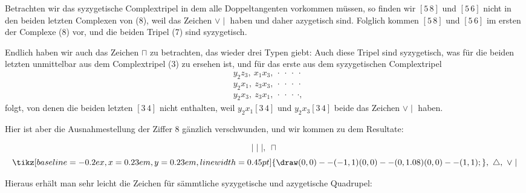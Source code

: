 \providecommand{\weberthreeup}{\mathord{\tikz[baseline=-0.2ex,x=0.23em,y=0.23em,line width=0.45pt]{\draw (0,0)--(-1,1) (0,0)--(0,1.08) (0,0)--(1,1);}}}
Betrachten wir das syzygetische Complextripel
in dem alle Doppeltangenten vorkommen müssen, so finden wir
$[5\,8]$ und $[5\,6]$ nicht in den beiden letzten Complexen von (8),
weil
das Zeichen $\vee\mid$ haben und daher azygetisch sind. Folglich kommen
 $[5\,8]$ und $[5\,6]$ im ersten der Complexe (8) vor, und die
beiden Tripel (7) sind syzygetisch.

Endlich haben wir auch das Zeichen $\sqcap$ zu betrachten, das
wieder drei Typen giebt:
Auch diese Tripel sind syzygetisch, was für die beiden letzten
unmittelbar aus dem Complextripel (3) zu ersehen ist, und für
das erste aus dem syzygetischen Complextripel
\[
\begin{aligned}
&y_2 z_3,\ x_1 x_3,\ \cdot\ \cdot\ \cdot\ \cdot\\
&y_2 x_1,\ z_3 x_3,\ \cdot\ \cdot\ \cdot\ \cdot\\
&y_2 x_3,\ z_3 x_1,\ \cdot\ \cdot\ \cdot\ \cdot,
\end{aligned}
\]
folgt, von denen die beiden letzten $[3\,4]$ nicht enthalten, weil
$y_2 x_1 [3\,4]$ und $y_2 x_3 [3\,4]$ beide das Zeichen $\vee\mid$ haben.

Hier ist aber die Ausnahmestellung der Ziffer 8 gänzlich
verschwunden, und wir kommen zu dem Resultate:

\[
\mid\mid\mid,\ \sqcap
\]
\[
\weberthreeup,\ \triangle,\ \vee\mid
\]

Hieraus erhält man sehr leicht die Zeichen für sämmtliche
syzygetische und azygetische Quadrupel:
